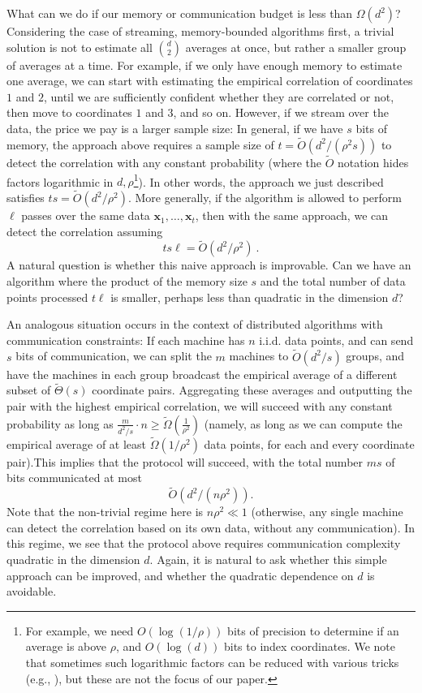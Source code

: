 \documentclass[final, 12pt]{colt2018}
\newcommand{\bx}{\mathbf{x}}
\begin{document}
What can we do if our memory or communication budget is less than $\Omega(d^2)$? Considering the case of streaming, memory-bounded algorithms first, a trivial solution is not to estimate all $\binom{d}{2}$ averages at once, but rather a smaller group of averages at a time. For example, if we only have enough memory to estimate one average, we can start with estimating the empirical correlation of coordinates $1$ and $2$, until we are sufficiently confident whether they are correlated or not, then move to coordinates $1$ and $3$, and so on. However, if we stream over the data, the price we pay is a larger sample size: In general, if we have $s$ bits of memory, the approach above requires a sample size of $t= \tilde{O}\left(d^2/\left( \rho^2 s \right)\right)$ to detect the correlation with any constant probability (where the $\tilde{O}$ notation hides factors logarithmic in $d,\rho$\footnote{For example, we need $O(\log(1/\rho))$ bits of precision to determine if an average is above $\rho$, and $O(\log(d))$ bits to index coordinates. We note that sometimes such logarithmic factors can be reduced with various tricks (e.g., \citet{luo2005universal}), but these are not the focus of our paper.}). In other words, the approach we just described satisfies
$ts = \tilde{O}\left(d^2/\rho^2\right)$.
More generally, if the algorithm is allowed to perform $\ell$ passes over the same data $\bx_1,\ldots,\bx_t$, then with the same approach, we can detect the correlation assuming 
\[
ts\ell=\tilde{O}\left(d^2/\rho^2\right)~.
\]
A natural question is whether this naive approach is improvable. Can we have an algorithm where the product of the memory size $s$ and the total number of data points processed $t\ell$ is smaller, perhaps less than quadratic in the dimension $d$?

An analogous situation occurs in the context of distributed algorithms with communication constraints: If each machine has $n$ i.i.d. data points, and can send $s$ bits of communication, we can split the $m$ machines to $\tilde{O}(d^2/s)$ groups, and have the machines in each group broadcast the empirical average of a different subset of $\tilde{\Theta}(s)$ coordinate pairs. Aggregating these averages and outputting the pair with the highest empirical correlation, we will succeed with any constant probability as long as 
$
\frac{m}{d^2/s}\cdot n \geq \tilde{\Omega}\left(\frac{1}{\rho^2}\right)
$
(namely, as long as we can compute the empirical average of at least $\tilde{\Omega}(1/\rho^2)$ data points, for each and every coordinate pair).This implies that the protocol will succeed, with the total number $ms$ of bits communicated at most
\[
\tilde{O}\left(d^2/(n\rho^2)\right).
\]
Note that the non-trivial regime here is $n\rho^2\ll 1$ (otherwise, any single machine can detect the correlation based on its own data, without any communication). In this regime, we see that the protocol above requires communication complexity quadratic in the dimension $d$. Again, it is natural to ask whether this simple approach can be improved, and whether the quadratic dependence on $d$ is avoidable. 
\end{document}
